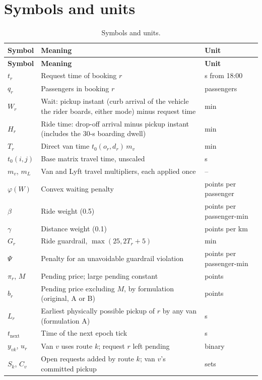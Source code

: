 \documentclass[11pt,letterpaper]{article}
\begin{document}
\section{Symbols and units}\label{app:symbols}
{\small
\begin{longtable}{@{}P{2.3cm}P{8.6cm}P{3.0cm}@{}}
\caption{Symbols and units.}\label{tab:symbols}\\
\toprule
\textbf{Symbol} & \textbf{Meaning} & \textbf{Unit}\\
\midrule
\endfirsthead
\toprule
\textbf{Symbol} & \textbf{Meaning} & \textbf{Unit}\\
\midrule
\endhead
\bottomrule
\endfoot
$t_r$ & Request time of booking $r$ & s from 18:00\\
$q_r$ & Passengers in booking $r$ & passengers\\
$W_r$ & Wait: pickup instant (curb arrival of the vehicle the rider boards, either mode) minus request time & min\\
$H_r$ & Ride time: drop-off arrival minus pickup instant (includes the 30-s boarding dwell) & min\\
$T_r$ & Direct van time $t_0(o_r, d_r)\, m_v$ & min\\
$t_0(i,j)$ & Base matrix travel time, unscaled & s\\
$m_v$, $m_L$ & Van and Lyft travel multipliers, each applied once & --\\
$\varphi(W)$ & Convex waiting penalty & points per passenger\\
$\beta$ & Ride weight (0.5) & points per passenger-min\\
$\gamma$ & Distance weight (0.1) & points per km\\
$G_r$ & Ride guardrail, $\max(25, 2T_r + 5)$ & min\\
$\Psi$ & Penalty for an unavoidable guardrail violation & points per passenger-min\\
$\pi_r$, $M$ & Pending price; large pending constant & points\\
$b_r$ & Pending price excluding $M$, by formulation (original, A or B) & points\\
$L_r$ & Earliest physically possible pickup of $r$ by any van (formulation A) & s\\
$t_{\text{next}}$ & Time of the next epoch tick & s\\
$y_{vk}$, $u_r$ & Van $v$ uses route $k$; request $r$ left pending & binary\\
$S_k$, $C_v$ & Open requests added by route $k$; van $v$'s committed pickup & sets\\

\end{longtable}}
\end{document}
